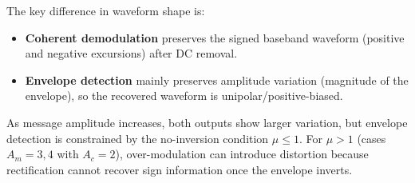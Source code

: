 The key difference in waveform shape is:
\begin{itemize}
\item \textbf{Coherent demodulation} preserves the signed baseband waveform (positive and negative excursions) after DC removal.
\item \textbf{Envelope detection} mainly preserves amplitude variation (magnitude of the envelope), so the recovered waveform is unipolar/positive-biased.
\end{itemize}

As message amplitude increases, both outputs show larger variation, but envelope detection is constrained by the no-inversion condition $\mu\le 1$. For $\mu>1$ (cases $A_m=3,4$ with $A_c=2$), over-modulation can introduce distortion because rectification cannot recover sign information once the envelope inverts.
